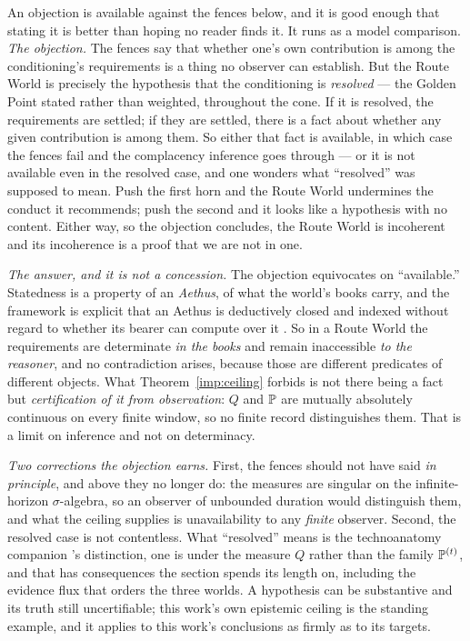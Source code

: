 \begin{remark}\label{gc:rem:determinacygap}
An objection is available against the fences below, and it is good enough
that stating it is better than hoping no reader finds it. It runs as a
model comparison. \emph{The objection.} The fences say that whether one's own contribution
is among the conditioning's requirements is a thing no observer can
establish. But the Route World is precisely the hypothesis that the
conditioning is \emph{resolved} --- the Golden Point stated rather than
weighted, throughout the cone. If it is resolved, the requirements are
settled; if they are settled, there is a fact about whether any given
contribution is among them. So either that fact is available, in which
case the fences fail and the complacency inference goes through --- or it
is not available even in the resolved case, and one wonders what
``resolved'' was supposed to mean. Push the first horn and the Route
World undermines the conduct it recommends; push the second and it looks
like a hypothesis with no content. Either way, so the objection
concludes, the Route World is incoherent and its incoherence is a proof
that we are not in one.

\emph{The answer, and it is not a concession.} The objection equivocates
on ``available.'' Statedness is a property of an \emph{Aethus}, of
what the world's books carry, and the framework is explicit that an
Aethus is deductively closed and indexed without regard to whether its
bearer can compute over it \cite{Aethus}. So in a Route World the
requirements are determinate \emph{in the books} and remain inaccessible
\emph{to the reasoner}, and no contradiction arises, because those are
different predicates of different objects. What
Theorem~\ref{imp:ceiling} forbids is not there being a fact but
\emph{certification of it from observation}: $Q$ and $\mathbb{P}$ are mutually
absolutely continuous on every finite window, so no finite record
distinguishes them. That is a limit on inference and not on determinacy.

\emph{Two corrections the objection earns.} First, the fences should not
have said \emph{in principle}, and above they no longer do: the measures
are singular on the infinite-horizon $\sigma$-algebra, so an observer of
unbounded duration would distinguish them, and what the ceiling supplies
is unavailability to any \emph{finite} observer. Second, the resolved
case is not contentless. What ``resolved'' means is
the technoanatomy companion \cite{GoldenTechnoanatomy}'s distinction, one is under the
measure $Q$ rather than the family $\mathbb{P}^{(t)}$, and that has
consequences the section spends its length on, including the evidence
flux that orders the three worlds. A hypothesis can be substantive and
its truth still uncertifiable; this work's own epistemic ceiling is the
standing example, and it applies to this work's conclusions as firmly as
to its targets.


\end{remark}
